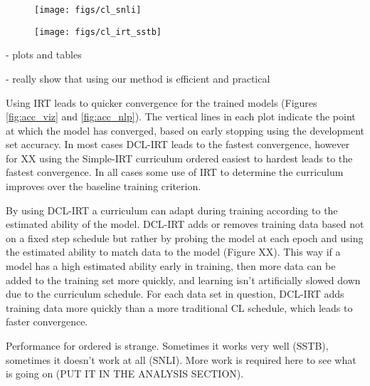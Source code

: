 \documentclass[letterpaper]{article} %
\begin{document}
\captionsetup[subfigure]{labelformat=empty}
\begin{figure*}[th!]
	\centering
	\begin{subfigure}[b]{0.45\textwidth}
		\centering
		\texttt{[image: figs/cl\_snli]}
		\caption{\label{fig:cl_snli}} 
		\vspace{-2em} 
	\end{subfigure} 
	\begin{subfigure}[b]{0.45\textwidth}
		\centering
		\texttt{[image: figs/cl\_irt\_sstb]}
		\caption{\label{fig:cl_sstb}} 
		\vspace{-2em} 
	\end{subfigure} 
	
	\caption{Test set accuracy as a function of training epoch.}
	\label{fig:acc_nlp}
\end{figure*}

- plots and tables 

- really show that using our method is efficient and practical 



Using IRT leads to quicker convergence for the trained models (Figures \ref{fig:acc_viz} and \ref{fig:acc_nlp}).
The vertical lines in each plot indicate the point at which the model has converged, based on early stopping using the development set accuracy.
In most cases DCL-IRT leads to the fastest convergence, however for XX using the Simple-IRT curriculum ordered easiest to hardest leads to the fastest convergence.
In all cases some use of IRT to determine the curriculum improves over the baseline training criterion. 

By using DCL-IRT a curriculum can adapt during training according to the estimated ability of the model.
DCL-IRT adds or removes training data based not on a fixed step schedule but rather by probing the model at each epoch and using the estimated ability to match data to the model (Figure XX).
This way if a model has a high estimated ability early in training, then more data can be added to the training set more quickly, and learning isn't artificially slowed down due to the curriculum schedule.
For each data set in question, DCL-IRT adds training data more quickly than a more traditional CL schedule, which leads to faster convergence.

Performance for ordered is strange.
Sometimes it works very well (SSTB), sometimes it doesn't work at all (SNLI).
More work is required here to see what is going on (PUT IT IN THE ANALYSIS SECTION).
\end{document}
